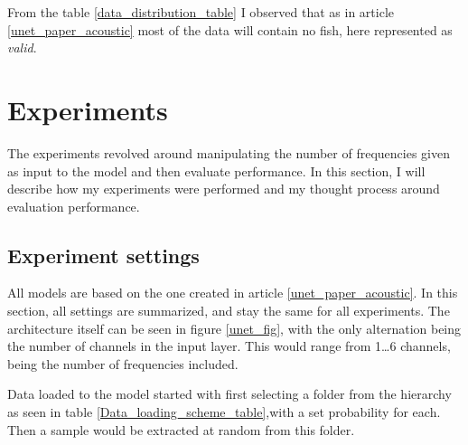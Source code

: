         From the table \ref{data_distribution_table} I observed that as in article \ref{unet_paper_acoustic} most of the data will contain no fish, here represented as \textit{valid}.

\clearpage
\section{Experiments}
    The experiments revolved around manipulating the number of frequencies given as input to the model and then evaluate performance. In this section, I will describe how my experiments were performed and my thought process around evaluation performance. 
    
    \subsection{Experiment settings} \label{Experiment settings}
        All models are based on the one created in article \ref{unet_paper_acoustic}. In this section, all settings are summarized, and stay the same for all experiments.
        The architecture itself can be seen in figure \ref{unet_fig}, with the only alternation being the number of channels in the input layer. This would range from 1…6 channels, being the number of frequencies included. 
        
        Data loaded to the model started with first selecting a folder from the hierarchy as seen in table \ref{Data_loading_scheme_table},with a set probability for each. Then a sample would be extracted at random from this folder. 
        
